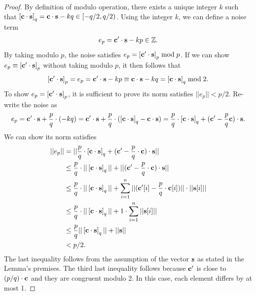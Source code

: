 \documentclass[../main.tex]{subfiles}
\begin{document}
\begin{proof}
By definition of modulo operation, there exists a unique integer $k$ such that $\left[{\mathbf{c} \cdot \mathbf{s}}\right]_q = \mathbf{c} \cdot \mathbf{s} - kq \in [-q/2, q/2)$. Using the integer $k$, we can define a noise term
\begin{align*}
    e_p = \mathbf{c}' \cdot \mathbf{s} - kp \in \mathbb{Z}.
\end{align*}
By taking modulo $p$, the noise satisfies $e_p = \left[{\mathbf{c}' \cdot \mathbf{s}}\right]_p \bmod p$. If we can show $e_p \equiv \left[{\mathbf{c}' \cdot \mathbf{s}}\right]_p$ without taking modulo $p$, it then follows that 
\begin{align*}
    \left[{\mathbf{c}' \cdot \mathbf{s}}\right]_p = e_p = \mathbf{c}' \cdot \mathbf{s} - kp \equiv \mathbf{c} \cdot \mathbf{s} - kq = \left[{\mathbf{c} \cdot \mathbf{s}}\right]_q \bmod 2.
\end{align*}
To show $e_p = \left[{\mathbf{c}' \cdot \mathbf{s}}\right]_p$, it is sufficient to prove its norm satisfies $||e_p|| < p/2$. Re-write the noise as 
\begin{align*}
    e_p 
    = \mathbf{c}' \cdot \mathbf{s} + \frac{p}{q}\cdot (-kq) 
    = \mathbf{c}' \cdot \mathbf{s} + \frac{p}{q} \cdot (\left[{\mathbf{c} \cdot \mathbf{s}}\right]_q - \mathbf{c} \cdot \mathbf{s}) 
    =\frac{p}{q} \cdot \left[{\mathbf{c} \cdot \mathbf{s}}\right]_q + (\mathbf{c}'-\frac{p}{q}\mathbf{c})\cdot \mathbf{s}.
\end{align*}
We can show its norm satisfies 
\begin{align*}
    ||e_p|| &= || \frac{p}{q} \cdot \left[{\mathbf{c} \cdot \mathbf{s}}\right]_q + (\mathbf{c}'-\frac{p}{q} \cdot \mathbf{c})\cdot \mathbf{s}||\\
    &\le \frac{p}{q} \cdot ||  \left[{\mathbf{c} \cdot \mathbf{s}}\right]_q|| + ||(\mathbf{c}'-\frac{p}{q} \cdot \mathbf{c})\cdot \mathbf{s}||\\
    &\le \frac{p}{q} \cdot ||  \left[{\mathbf{c} \cdot \mathbf{s}}\right]_q|| + \sum_{i=1}^{n} ||(\mathbf{c}'[i]-\frac{p}{q} \cdot \mathbf{c}[i])|| \cdot ||\mathbf{s}[i]||\\
    &\le \frac{p}{q} \cdot ||  \left[{\mathbf{c} \cdot \mathbf{s}}\right]_q|| + 1 \cdot \sum_{i=1}^{n} ||\mathbf{s}[i]||\\
    &\le \frac{p}{q} ||\left[{\mathbf{c} \cdot \mathbf{s}}\right]_q|| + ||\mathbf{s}|| \\
    &< p/2.
\end{align*}
The last inequality follows from the assumption of the vector $\mathbf{s}$ as stated in the Lemma's premises. The third last inequality follows because $\mathbf{c}'$ is close to $(p/q)\cdot \mathbf{c}$ and they are congruent modulo 2. In this case, each element differs by at most 1. 
\end{proof}
\end{document}
